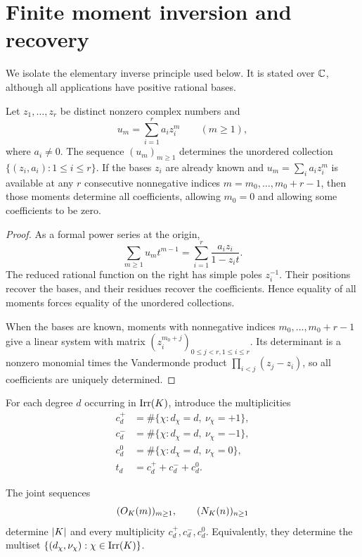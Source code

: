 \section{Finite moment inversion and recovery}
\label{sec:moment-recovery}

We isolate the elementary inverse principle used below.  It is stated over
$\mathbb{C}$, although all applications have positive rational bases.

\begin{lemma}
\label{lem:finite-moments}
Let $z_1,\ldots,z_r$ be distinct nonzero complex numbers and
\[
 u_m=\sum_{i=1}^r a_i z_i^m\qquad(m\geq1),
\]
where $a_i\neq0$.  The sequence $(u_m)_{m\geq1}$ determines the unordered
collection $\{(z_i,a_i):1\leq i\leq r\}$.  If the bases $z_i$ are already
known and $u_m=\sum_i a_i z_i^m$ is available at any $r$ consecutive
nonnegative indices $m=m_0,\ldots,m_0+r-1$, then those moments determine all
coefficients, allowing $m_0=0$ and allowing some coefficients to be zero.
\end{lemma}

\begin{proof}
As a formal power series at the origin,
\begin{equation}
 \sum_{m\geq1}u_m t^{m-1}
 =\sum_{i=1}^r\frac{a_i z_i}{1-z_i t}.
 \label{eq:moment-generating}
\end{equation}
The reduced rational function on the right has simple poles $z_i^{-1}$.
Their positions recover the bases, and their residues recover the
coefficients.  Hence equality of all moments forces equality of the unordered
collections.

When the bases are known, moments with nonnegative indices
$m_0,\ldots,m_0+r-1$ give a
linear system with matrix
$(z_i^{m_0+j})_{0\leq j<r,1\leq i\leq r}$.  Its determinant is a nonzero
monomial times the Vandermonde product
$\prod_{i<j}(z_j-z_i)$, so all coefficients are uniquely determined.
\end{proof}

For each degree $d$ occurring in $\operatorname{Irr}(K)$, introduce the multiplicities
\begin{align*}
 c_d^+&=\#\{\chi:d_\chi=d,\ \nu_\chi=+1\},\\
 c_d^-&=\#\{\chi:d_\chi=d,\ \nu_\chi=-1\},\\
 c_d^0&=\#\{\chi:d_\chi=d,\ \nu_\chi=0\},\\
 t_d&=c_d^++c_d^-+c_d^0.
\end{align*}

\begin{theorem}
\label{thm:reconstruction}
The joint sequences
\[
 (O_{K}(m))_{m\geq1},\qquad (N_{K}(n))_{n\geq1}
\]
determine $|K|$ and every multiplicity $c_d^+,c_d^-,c_d^0$.  Equivalently,
they determine the multiset
$\{(d_\chi,\nu_\chi):\chi\in\operatorname{Irr}(K)\}$.
\end{theorem}

